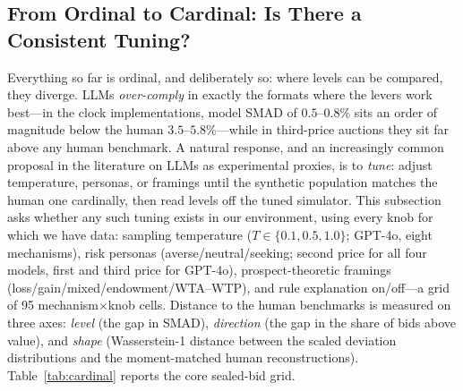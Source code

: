 \subsection{From Ordinal to Cardinal: Is There a Consistent Tuning?}\label{sec:humans-cardinal}

Everything so far is ordinal, and deliberately so: where levels can be compared, they diverge. LLMs \emph{over-comply} in exactly the formats where the levers work best---in the clock implementations, model SMAD of $0.5$--$0.8\%$ sits an order of magnitude below the human $3.5$--$5.8\%$---while in third-price auctions they sit far above any human benchmark. A natural response, and an increasingly common proposal in the literature on LLMs as experimental proxies, is to \emph{tune}: adjust temperature, personas, or framings until the synthetic population matches the human one cardinally, then read levels off the tuned simulator. This subsection asks whether any such tuning exists in our environment, using every knob for which we have data: sampling temperature ($T\in\{0.1,0.5,1.0\}$; GPT-4o, eight mechanisms), risk personas (averse/neutral/seeking; second price for all four models, first and third price for GPT-4o), prospect-theoretic framings (loss/gain/mixed/endowment/WTA--WTP), and rule explanation on/off---a grid of 95 mechanism$\times$knob cells. Distance to the human benchmarks is measured on three axes: \emph{level} (the gap in SMAD), \emph{direction} (the gap in the share of bids above value), and \emph{shape} (Wasserstein-1 distance between the scaled deviation distributions and the moment-matched human reconstructions). Table~\ref{tab:cardinal} reports the core sealed-bid grid.

